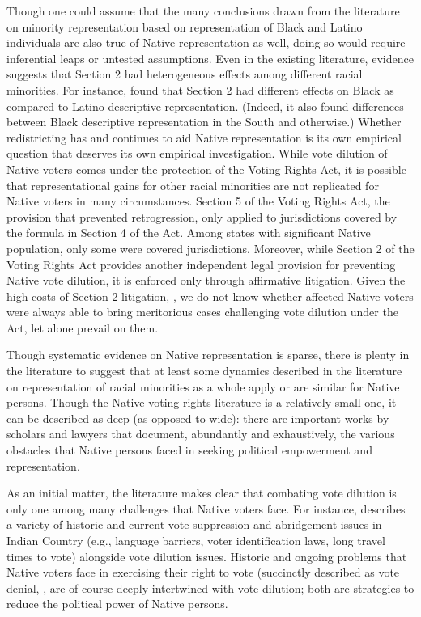 \documentclass[12pt]{article}
\begin{document}
Though one could assume that the many conclusions drawn from the literature on minority representation based on representation of Black and Latino individuals are also true of Native representation as well, doing so would require inferential leaps or untested assumptions. Even in the existing literature, evidence suggests that Section 2 had heterogeneous effects among different racial minorities.  For instance, \cite{stephanopoulos2016race} found that Section 2 had different effects on Black as compared to Latino descriptive representation.  (Indeed, it also found differences between Black descriptive representation in the South and otherwise.)  Whether redistricting has and continues to aid Native representation is its own empirical question that deserves its own empirical investigation. While vote dilution of Native voters comes under the protection of the Voting Rights Act, it is possible that representational gains for other racial minorities are not replicated for Native voters in many circumstances. Section 5 of the Voting Rights Act, the provision that prevented retrogression, only applied to jurisdictions covered by the formula in Section 4 of the Act. Among states with significant Native population, only some were covered jurisdictions.  Moreover, while Section 2 of the Voting Rights Act provides another independent legal provision for preventing Native vote dilution, it is enforced only through affirmative litigation. Given the high costs of Section 2 litigation, \cite{elmendorf2015administering}, we do not know whether affected Native voters were always able to bring meritorious cases challenging vote dilution under the Act, let alone prevail on them.

Though systematic evidence on Native representation is sparse, there is plenty in the literature to suggest that at least some dynamics described in the literature on representation of racial minorities as a whole apply or are similar for Native persons. Though the Native voting rights literature is a relatively small one, it can be described as deep (as opposed to wide): there are important works by scholars and lawyers that document, abundantly and exhaustively, the various obstacles that Native persons faced in seeking political empowerment and representation.


As an initial matter, the literature makes clear that combating vote dilution is only one among many challenges that Native voters face. For instance, \cite{schroedel2020voting} describes a variety of historic and current vote suppression and abridgement issues in Indian Country (e.g., language barriers, voter identification laws, long travel times to vote) alongside vote dilution issues. Historic and ongoing problems that Native voters face in exercising their right to vote (succinctly described as vote denial, \cite{tokaji2006new}, are of course deeply intertwined with vote dilution; both are strategies to reduce the political power of Native persons.
\end{document}
